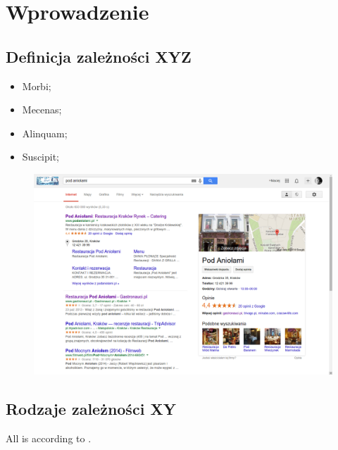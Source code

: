 \section{Wprowadzenie}
\label{sec:wprowadzenie}

\lipsum[2-3]

\subsection{Definicja zależności XYZ}

\begin{defn} 
\lipsum[1]
\end{defn}

\begin{itemize}
\item Morbi;
\item Mecenas;
\item Alinquam;
\item Suscipit;
\end{itemize}

\lipsum[6-8]

\begin{figure}[!h]
\centering
    \includegraphics[width=1.0\textwidth]{images/search-result-company-in-google-search-engine.png}
    \label{fig:search-result-company-in-google-search-engine}
\end{figure}


\subsection{Rodzaje zależności XY}
\lipsum[6-10] All is according to \parencite{url:zaraz-po-instalacji}.

